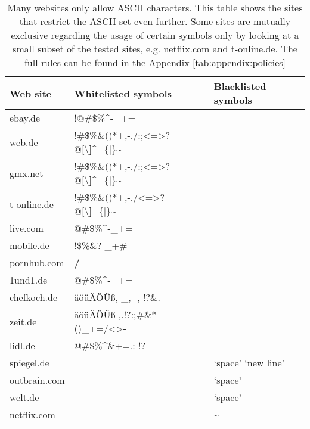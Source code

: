 \begin{table}[htbp]
\small
\centering
	\begin{tabular}{lll}
		\textbf{Web site} & \textbf{Whitelisted symbols} & \textbf{Blacklisted symbols}\\ \hline
		ebay.de & !@\#\$\%\textasciicircum*-\_+= & \\
		web.de & !\#\$\%\&()*+,-./:;<=>?@[\textbackslash]\textasciicircum\_\{|\}\textasciitilde{}{\ss} & \\
		gmx.net & !\#\$\%\&()*+,-./:;<=>?@[\textbackslash]\textasciicircum\_\{|\}\textasciitilde{}{\ss} &\\
		t-online.de & !\#\$\%\&()*+,-./<=>?@[\textbackslash]\_\{|\}\textasciitilde &\\
		live.com & @\#\$\%\textasciicircum*-\_+= &\\
		mobile.de & !\$\%\&?-\_+\# & \\
		pornhub.com & \textbf{/\_} & \\
		1und1.de & @\#\$\%\textasciicircum*-\_+= &\\
		chefkoch.de & äöüÄÖÜ{\ss}, \_, -, !?\&. &\\
		zeit.de & äöüÄÖÜ{\ss} ,.!?:;\#\&* ()\_+=/<>- &\\
		lidl.de & @\#\$\%\textasciicircum\&+=.:-!? &\\
		\bottomrule
		spiegel.de & & `space' `new line' \\
        outbrain.com & & `space' \\
   		welt.de & & `space' \\
   		netflix.com & & \textasciitilde \\
	\end{tabular}
	\caption{
		Many websites only allow ASCII characters. This table shows the sites that restrict the ASCII set even further. Some sites are mutually exclusive regarding the usage of certain symbols only by looking at a small subset of the tested sites, e.g. netflix.com and t-online.de. The full rules can be found in the Appendix \ref{tab:appendix:policies}
	}
	\label{tab:policies_reuse:black-white-lists}
\end{table}